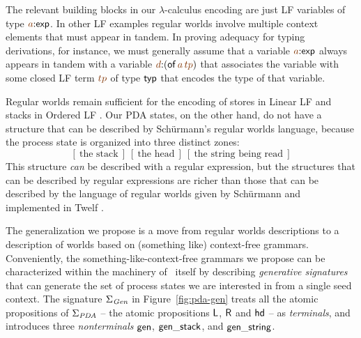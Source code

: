 The relevant building blocks in our $\lambda$-calculus encoding are
just LF variables of type $\lf{a}{:}{\sf exp}$. In other LF examples
regular worlds involve multiple context elements that must appear in
tandem. In proving adequacy for typing derivations, for instance, we
must generally assume that a variable $\lf{a}{:}{\sf exp}$ always
appears in tandem with a variable $\lf{d}{:}({\sf
  of}\,\lf{a}\,\lf{tp})$ that associates the variable with some closed
LF term $\lf{tp}$ of type ${\sf typ}$ that encodes the type of that
variable.

Regular worlds remain sufficient for the encoding of stores in Linear
LF \cite{cervesato02linear} and stacks in Ordered LF
\cite{polakow01ordered}. Our PDA states, on the other hand, do not
have a structure that can be described by Sch\"urmann's regular
worlds language, because the process state is organized into three
distinct zones:
\[
[~\mbox{the stack}~]
~
[~\mbox{the head}~]
~
[~\mbox{the string being read}~]
\]
This structure {\it can} be described with a regular expression, but
the structures that can be described by regular expressions are richer
than those that can be described by the language of regular worlds
given by Sch\"urmann and implemented in Twelf
\cite{schurmann00automating}.

The generalization we propose is a move from regular worlds
descriptions to a description of worlds based on (something like)
context-free grammars.  Conveniently, the something-like-context-free
grammars we propose can be characterized within the
machinery of \sls~itself by describing {\it generative signatures}
that can generate the set of process states we are interested in from
a single seed context.  The signature $\Sigma_{\it Gen}$ in
Figure~\ref{fig:pda-gen} treats all the atomic propositions of
$\Sigma_{\it PDA}$ -- the atomic propositions ${\sf L}$, ${\sf R}$ and
${\sf hd}$ -- as {\it terminals}, and introduces three {\it
  nonterminals} ${\sf gen}$, ${\sf gen\_stack}$, and ${\sf
  gen\_string}$.

